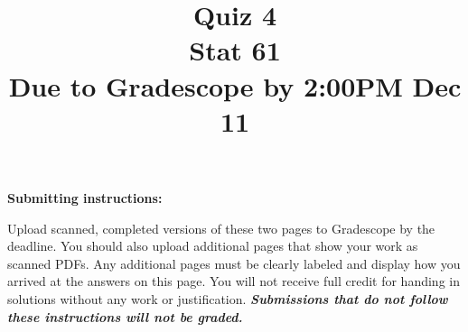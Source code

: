 \documentclass[12pt]{article}
\title{Quiz 4\\
Stat 61\\ 
Due to Gradescope by 2:00PM Dec 11}
\date{}
\begin{document}
\maketitle


\vspace{-3cm}

\noindent \textbf{Submitting instructions:} 

\noindent Upload scanned, completed versions of these two pages to Gradescope by the deadline. You should also upload additional pages that show your work as scanned PDFs. Any additional pages must be clearly labeled and display how you arrived at the answers on this page. You will not receive full credit for handing in solutions without any work or justification. \textbf{\textit{Submissions that do not follow these instructions will not be graded.}} 

\vspace{0.5cm}
\end{document}
